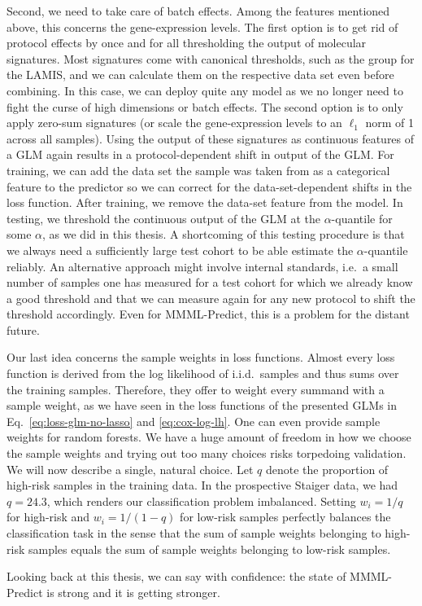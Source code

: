 Second, we need to take care of batch effects. Among the features mentioned above, this concerns 
the gene-expression levels. The first option is to get rid of protocol effects by once and for all
thresholding the output of molecular signatures. Most signatures come with canonical thresholds, 
such as the group for the LAMIS, and we can calculate them on the respective data set even before 
combining. In this case, we can deploy quite any model as we no longer need to fight the curse 
of high dimensions or batch effects. The second option is to only apply zero-sum signatures (or 
scale the gene-expression levels to an $\ell_1$ norm of \num{1} across all samples). Using the 
output of these signatures as continuous features of a GLM again results in a protocol-dependent 
shift in output of the GLM. For training, we can add the data set the sample was taken from as a 
categorical 
feature to the predictor so we can correct for the data-set-dependent shifts in the loss function. 
After training, we remove the data-set feature from the model. In testing, 
we threshold the continuous output of the GLM at the $\alpha$-quantile for some $\alpha$, as we did 
in this thesis. A shortcoming of this testing procedure is that we always need a sufficiently large 
test cohort to be able estimate the $\alpha$-quantile reliably. An alternative approach might 
involve internal standards, i.e.\ a small number of samples one has measured for a test cohort for 
which we already know a good threshold and that we can measure again for any new protocol to shift 
the threshold accordingly. Even for MMML-Predict, this is a problem for the distant future.

Our last idea concerns the sample weights in loss functions. Almost every loss function is derived 
from the log likelihood of i.i.d.\ samples and thus sums over the training samples. Therefore, they 
offer to weight every summand with a sample weight, as we have seen in the loss functions of the 
presented GLMs in Eq.\ \eqref{eq:loss-glm-no-lasso} and \eqref{eq:cox-log-lh}. One can even provide 
sample weights for random forests. We have a huge amount of 
freedom in how we choose the sample weights and trying out too many choices risks torpedoing 
validation. We will now describe a single, natural choice. Let $q$ denote the 
proportion of high-risk samples in the training data. In the prospective Staiger data, we had 
$q = \num{24.3}$, which renders our classification problem imbalanced. Setting $w_i = 1/q$ for 
high-risk and $w_i = 1/(1-q)$ for low-risk samples perfectly balances the classification task in 
the sense that the sum of sample weights belonging to high-risk samples equals the sum of sample 
weights belonging to low-risk samples.

Looking back at this thesis, we can say with confidence: the state of MMML-Predict is strong and 
it is getting stronger.